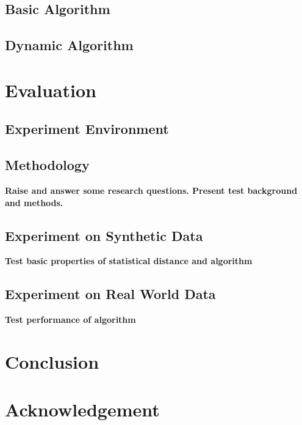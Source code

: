 \documentclass[a4paper]{IEEEtran}
\begin{document}
		\subsection{Basic Algorithm}
		
		\subsection{Dynamic Algorithm}
	
	\section{Evaluation}\label{sec:evaluation}
		\subsection{Experiment Environment}
		
		\subsection{Methodology}
			\textbf{Raise and answer some research questions. Present test background and methods.}
			
		\subsection{Experiment on Synthetic Data}
			\textbf{Test basic properties of statistical distance and algorithm}
		
		\subsection{Experiment on Real World Data}
			\textbf{Test performance of algorithm}
	
	\section{Conclusion}\label{sec:conclusion}
	
	\section*{Acknowledgement}
		
	\printbibliography
\end{document}

